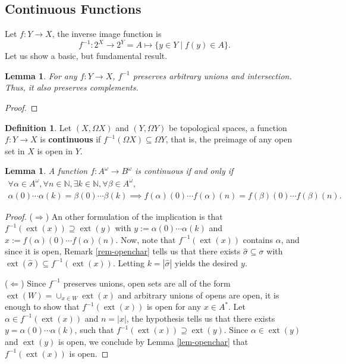 \documentclass{tufte-handout} %
\newtheorem{lem}[thm]{Lemma}
\theoremstyle{definition}
\newtheorem{defn}[thm]{Definition}
\theoremstyle{remark}
\newcommand{\N}{\mathbb{N}}
\newcommand{\0}{\textsf{0}}
\newcommand{\1}{\textsf{1}}
\DeclareMathOperator{\ext}{ext}
\begin{document}
\subsection{Continuous Functions}
Let $f: Y \rightarrow X$, the inverse image function is \[f^{-1} : 2^X \rightarrow 2^Y = A \mapsto \{y \in Y \mid f(y) \in A\}.\]
Let us show a basic, but fundamental result.
\begin{lem}
	For any $f: Y\rightarrow X$, $f^{-1}$ preserves arbitrary unions and intersection. Thus, it also preserves complements.
\end{lem}
\begin{proof}
\end{proof}
\begin{defn}
	Let $(X,\Omega X)$ and $(Y, \Omega Y)$ be topological spaces, a function $f:Y\rightarrow X$ is \textbf{continuous} if $f^{-1}(\Omega X) \subseteq \Omega Y$, that is, the preimage of any open set in $X$ is open in $Y$.
\end{defn}
\begin{lem}
	A function $f: A^{\omega} \rightarrow B^{\omega}$ is continuous if and only if \begin{gather*}\forall\alpha \in A^{\omega}, \forall n \in \N,\exists k \in \N, \forall \beta \in A^{\omega},\\ \alpha(0)\cdots \alpha(k) = \beta(0) \cdots \beta(k) \implies f(\alpha)(0)\cdots f(\alpha)(n) = f(\beta)(0)\cdots f(\beta)(n).
	\end{gather*}
\end{lem}
\begin{proof}
	($\Rightarrow$) An other formulation of the implication is that $f^{-1}(\ext(x)) \supseteq \ext(y)$ with $y := \alpha(0)\cdots \alpha(k)$ and $x:= f(\alpha)(0)\cdots f(\alpha)(n)$. Now, note that $f^{-1}(\ext(x))$ contains $\alpha$, and since it is open, Remark \ref{rem-openchar} tells us that there exists $\hat{\sigma} \subseteq \sigma$ with $\ext(\hat{\sigma}) \subseteq f^{-1}(\ext(x))$. Letting $k = |\hat{\sigma}|$ yields the desired $y$.
	
	($\Leftarrow$) Since $f^{-1}$ preserves unions, open sets are all of the form $\ext(W) = \cup_{x \in W} \ext(x)$ and arbitrary unions of opens are open, it is enough to show that $f^{-1}(\ext(x))$ is open for any $x \in A^*$. Let $\alpha \in f^{-1}(\ext(x))$ and $n = |x|$, the hypothesis tells us that there exists $y = \alpha(0)\cdots \alpha(k)$, such that $f^{-1}(\ext(x)) \supseteq \ext(y)$. Since $\alpha \in \ext(y)$ and $\ext(y)$ is open, we conclude by Lemma \ref{lem-openchar} that $f^{-1}(\ext(x))$ is open. 
\end{proof}
\end{document}
